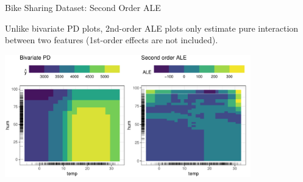 \documentclass[10pt,compress,t,notes=noshow, xcolor=table]{beamer}
\begin{document}
\begin{frame}{Bike Sharing Dataset: Second Order ALE}

Unlike bivariate PD plots, 2nd-order ALE plots only estimate pure interaction between two features (1st-order effects are not included).

\vspace{0.1cm}

\begin{center}
\includegraphics[width=0.8\textwidth]{figure/ale2d}
\end{center}

\end{frame}



\end{document}

